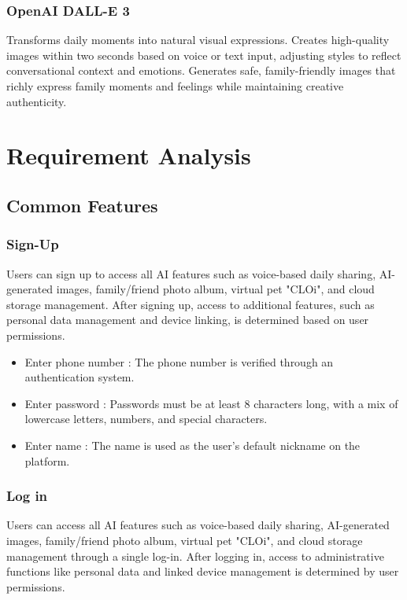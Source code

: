 \documentclass[conference]{IEEEtran}
\begin{document}
        \subsubsection{OpenAI DALL-E 3}
        Transforms daily moments into natural visual expressions. Creates high-quality images within two seconds based on voice or text input, adjusting styles to reflect conversational context and emotions. Generates safe, family-friendly images that richly express family moments and feelings while maintaining creative authenticity.

\section{Requirement Analysis}
    \subsection{Common Features}
        \subsubsection{Sign-Up}
            Users can sign up to access all AI features such as voice-based daily sharing, AI-generated images, family/friend photo album, virtual pet "CLOi", and cloud storage management. After signing up, access to additional features, such as personal data management and device linking, is determined based on user permissions.
            \begin{itemize}
                \item Enter phone number : The phone number is verified through an authentication system.
                \item Enter password : Passwords must be at least 8 characters long, with a mix of lowercase letters, numbers, and special characters.
                \item Enter name : The name is used as the user's default nickname on the platform.
            \end{itemize}

        \subsubsection{Log in}
            Users can access all AI features such as voice-based daily sharing, AI-generated images, family/friend photo album, virtual pet "CLOi", and cloud storage management through a single log-in. After logging in, access to administrative functions like personal data and linked device management is determined by user permissions.
\end{document}
